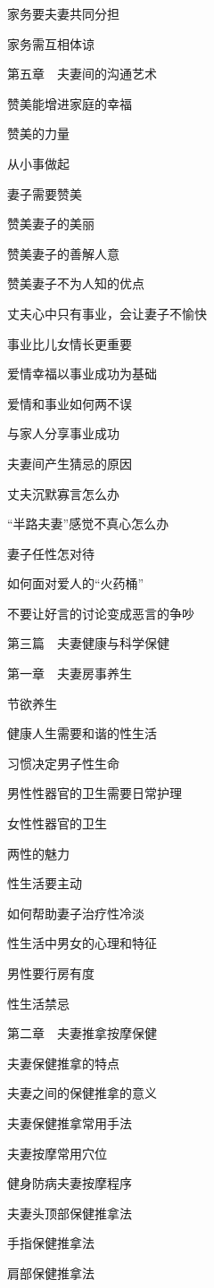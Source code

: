 \documentclass[12pt,UTF8]{ctexbook}
\begin{document}
家务要夫妻共同分担

家务需互相体谅

第五章　夫妻间的沟通艺术

赞美能增进家庭的幸福

赞美的力量

从小事做起

妻子需要赞美

赞美妻子的美丽

赞美妻子的善解人意

赞美妻子不为人知的优点

丈夫心中只有事业，会让妻子不愉快

事业比儿女情长更重要

爱情幸福以事业成功为基础

爱情和事业如何两不误

与家人分享事业成功

夫妻间产生猜忌的原因

丈夫沉默寡言怎么办

“半路夫妻”感觉不真心怎么办

妻子任性怎对待

如何面对爱人的“火药桶”

不要让好言的讨论变成恶言的争吵

第三篇　夫妻健康与科学保健

第一章　夫妻房事养生

节欲养生

健康人生需要和谐的性生活

习惯决定男子性生命

男性性器官的卫生需要日常护理

女性性器官的卫生

两性的魅力

性生活要主动

如何帮助妻子治疗性冷淡

性生活中男女的心理和特征

男性要行房有度

性生活禁忌

第二章　夫妻推拿按摩保健

夫妻保健推拿的特点

夫妻之间的保健推拿的意义

夫妻保健推拿常用手法

夫妻按摩常用穴位

健身防病夫妻按摩程序

夫妻头顶部保健推拿法

手指保健推拿法

肩部保健推拿法
\end{document}
